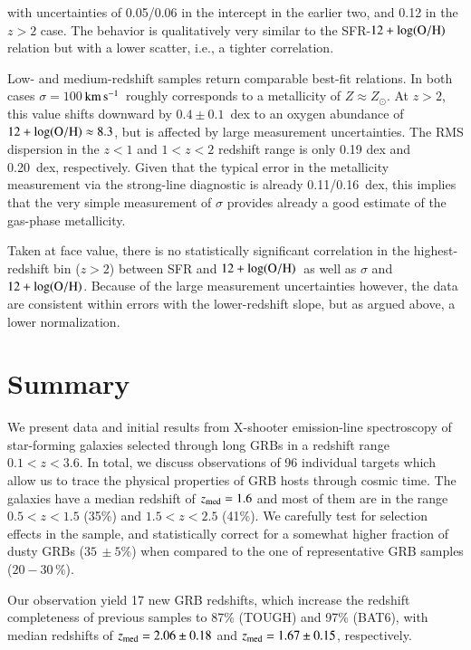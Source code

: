 \documentclass[traditabstract, longauth]{aa}
\newcommand{\kms}{$\rm{km\,s^{-1}}$}
\newcommand{\oh}{12+\log(\rm{O/H})}
\begin{document}
with uncertainties of 0.05/0.06 in the intercept in the earlier two, and 0.12 in the $z>2$ case. The behavior is qualitatively very similar to the SFR-$\oh$ relation but with a lower scatter, i.e., a tighter correlation. 

Low- and medium-redshift samples return comparable best-fit relations. In both cases $\sigma=100$\,\kms\, roughly corresponds to a metallicity of $Z\approx Z_{\odot}$. At $z > 2$, this value shifts downward by $0.4\pm0.1$~dex to an oxygen abundance of $\oh \approx 8.3$, but is affected by large measurement uncertainties.  {The RMS dispersion in the $z<1$ and $1<z<2$ redshift range is only 0.19 dex and 0.20~dex, respectively. Given that the typical error in the metallicity measurement via the strong-line diagnostic is already 0.11/0.16~dex, this implies that the very simple measurement of $\sigma$ provides already a good estimate of the gas-phase metallicity.}

Taken at face value, there is no statistically significant correlation in the highest-redshift bin ($z>2$) between SFR and $\oh$\, as well as $\sigma$ and $\oh$. Because of the large measurement uncertainties however, the data are consistent within errors with the lower-redshift slope, but as argued above, a lower normalization.

\section{Summary} 
\label{sec:conc}

We present data and initial results from X-shooter emission-line spectroscopy of star-forming galaxies selected through long GRBs in a redshift range $0.1<z<3.6$. In total, we discuss observations of 96 individual targets which allow us to trace the physical properties of GRB hosts through cosmic time. The galaxies have a median redshift of $z_{\rm med}=1.6$ and most of them are in the range $0.5 < z < 1.5$ (35\%) and $1.5 < z < 2.5$ (41\%). We carefully test for selection effects in the sample, and statistically correct for a somewhat higher fraction of dusty GRBs ($35\,\pm5\%$) when compared to the one of representative GRB samples ($20-30\,\%$). 

Our observation yield 17 new GRB redshifts, which increase the redshift completeness of previous samples to 87\% (TOUGH) and 97\% (BAT6), with median redshifts of $z_{\rm{med}} = 2.06\pm0.18$ and $z_{\rm{med}} = 1.67\pm0.15$, respectively.
\end{document}

